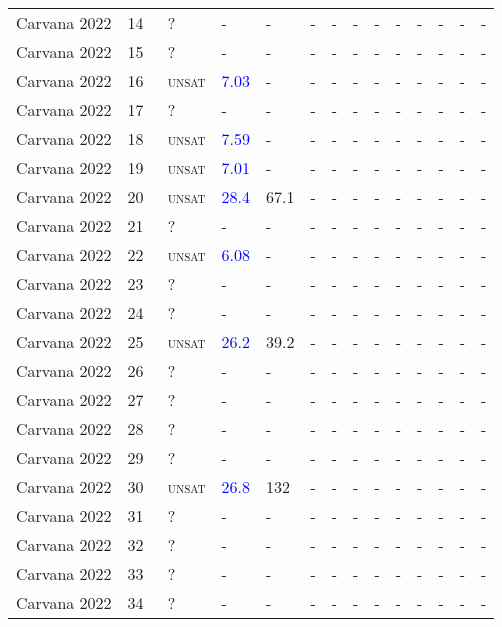 \begin{center}
{\begin{longtable}{@{}llllllllllllll@{}}
Carvana 2022 & 14 & ~? & - & - & - & - & - & - & - & - & - & - & - \\
Carvana 2022 & 15 & ~? & - & - & - & - & - & - & - & - & - & - & - \\
Carvana 2022 & 16 & ~\textsc{unsat} & \textcolor{blue}{7.03} & - & - & - & - & - & - & - & - & - & - \\
Carvana 2022 & 17 & ~? & - & - & - & - & - & - & - & - & - & - & - \\
Carvana 2022 & 18 & ~\textsc{unsat} & \textcolor{blue}{7.59} & - & - & - & - & - & - & - & - & - & - \\
Carvana 2022 & 19 & ~\textsc{unsat} & \textcolor{blue}{7.01} & - & - & - & - & - & - & - & - & - & - \\
Carvana 2022 & 20 & ~\textsc{unsat} & \textcolor{blue}{28.4} & \textcolor{second}{67.1} & - & - & - & - & - & - & - & - & - \\
Carvana 2022 & 21 & ~? & - & - & - & - & - & - & - & - & - & - & - \\
Carvana 2022 & 22 & ~\textsc{unsat} & \textcolor{blue}{6.08} & - & - & - & - & - & - & - & - & - & - \\
Carvana 2022 & 23 & ~? & - & - & - & - & - & - & - & - & - & - & - \\
Carvana 2022 & 24 & ~? & - & - & - & - & - & - & - & - & - & - & - \\
Carvana 2022 & 25 & ~\textsc{unsat} & \textcolor{blue}{26.2} & \textcolor{second}{39.2} & - & - & - & - & - & - & - & - & - \\
Carvana 2022 & 26 & ~? & - & - & - & - & - & - & - & - & - & - & - \\
Carvana 2022 & 27 & ~? & - & - & - & - & - & - & - & - & - & - & - \\
Carvana 2022 & 28 & ~? & - & - & - & - & - & - & - & - & - & - & - \\
Carvana 2022 & 29 & ~? & - & - & - & - & - & - & - & - & - & - & - \\
Carvana 2022 & 30 & ~\textsc{unsat} & \textcolor{blue}{26.8} & \textcolor{second}{132} & - & - & - & - & - & - & - & - & - \\
Carvana 2022 & 31 & ~? & - & - & - & - & - & - & - & - & - & - & - \\
Carvana 2022 & 32 & ~? & - & - & - & - & - & - & - & - & - & - & - \\
Carvana 2022 & 33 & ~? & - & - & - & - & - & - & - & - & - & - & - \\
Carvana 2022 & 34 & ~? & - & - & - & - & - & - & - & - & - & - & - \\

\end{longtable}}
\end{center}
